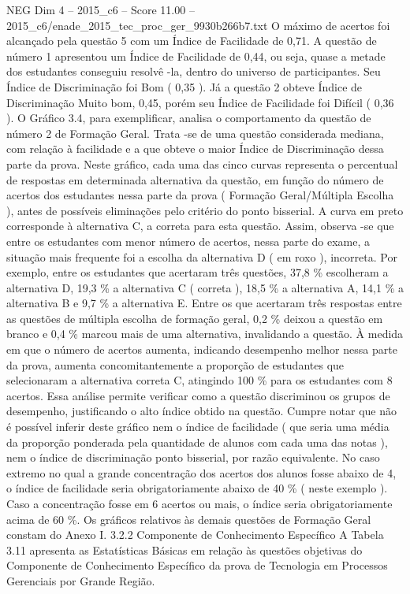 \begin{textsample}{NEG Dim 4 – 2015\_c6 – Score 11.00 – 2015\_c6/enade\_2015\_tec\_proc\_ger\_9930b266b7.txt}
O máximo de acertos foi alcançado pela questão 5 com um Índice de Facilidade de 0,71.
A questão de número 1 apresentou um Índice de Facilidade de 0,44, ou seja, quase a metade dos estudantes conseguiu resolvê -la, dentro do universo de participantes.
Seu Índice de Discriminação foi Bom ( 0,35 ).
Já a questão 2 obteve Índice de Discriminação Muito bom, 0,45, porém seu Índice de Facilidade foi Difícil ( 0,36 ).
O Gráfico 3.4, para exemplificar, analisa o comportamento da questão de número 2 de Formação Geral.
Trata -se de uma questão considerada mediana, com relação à facilidade e a que obteve o maior Índice de Discriminação dessa parte da prova.
Neste gráfico, cada uma das cinco curvas representa o percentual de respostas em determinada alternativa da questão, em função do número de acertos dos estudantes nessa parte da prova ( Formação Geral/Múltipla Escolha ), antes de possíveis eliminações pelo critério do ponto bisserial.
A curva em preto corresponde à alternativa C, a correta para esta questão.
Assim, observa -se que entre os estudantes com menor número de acertos, nessa parte do exame, a situação mais frequente foi a escolha da alternativa D ( em roxo ), incorreta.
Por exemplo, entre os estudantes que acertaram três questões, 37,8 \% escolheram a alternativa D, 19,3 \% a alternativa C ( correta ), 18,5 \% a alternativa A, 14,1 \% a alternativa B e 9,7 \% a alternativa E.
Entre os que acertaram três respostas entre as questões de múltipla escolha de formação geral, 0,2 \% deixou a questão em branco e 0,4 \% marcou mais de uma alternativa, invalidando a questão.
À medida em que o número de acertos aumenta, indicando desempenho melhor nessa parte da prova, aumenta concomitantemente a proporção de estudantes que selecionaram a alternativa correta C, atingindo 100 \% para os estudantes com 8 acertos.
Essa análise permite verificar como a questão discriminou os grupos de desempenho, justificando o alto índice obtido na questão.
Cumpre notar que não é possível inferir deste gráfico nem o índice de facilidade ( que seria uma média da proporção ponderada pela quantidade de alunos com cada uma das notas ), nem o índice de discriminação ponto bisserial, por razão equivalente.
No caso extremo no qual a grande concentração dos acertos dos alunos fosse abaixo de 4, o índice de facilidade seria obrigatoriamente abaixo de 40 \% ( neste exemplo ).
Caso a concentração fosse em 6 acertos ou mais, o índice seria obrigatoriamente acima de 60 \%.
Os gráficos relativos às demais questões de Formação Geral constam do Anexo I. 3.2.2 Componente de Conhecimento Específico A Tabela 3.11 apresenta as Estatísticas Básicas em relação às questões objetivas do Componente de Conhecimento Específico da prova de Tecnologia em Processos Gerenciais por Grande Região.

\end{textsample}
